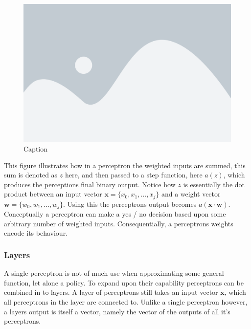 \begin{figure}[H]
    \centering
    \includegraphics[width=0.6\linewidth]{figures/placeholder.png}
    \caption{Caption}
    \label{fig:my_label}
\end{figure}
\noindent
This figure illustrates how in a perceptron the weighted inputs are summed, this sum is denoted as $z$ here, and then passed to a step function, here $a(z)$, which produces the perceptions final binary output. Notice how $z$ is essentially the dot product between an input vector $\mathbf{x} = \{x_0, x_1, \dots, x_j\}$ and a weight vector $\mathbf{w} = \{ w_0, w_1, \dots, w_j \}$. Using this the perceptrons output becomes $a(\mathbf{x} \cdot \mathbf{w})$. Conceptually a perceptron can make a yes / no decision based upon some arbitrary number of weighted inputs. Consequentially, a perceptrons weights encode its behaviour. 

\subsubsection{Layers}\label{subsubsec:nn:comp:layers}
A single perceptron is not of much use when approximating some general function, let alone a policy. To expand upon their capability perceptrons can be combined in to layers. A layer of perceptrons still takes an input vector $\mathbf{x}$, which all perceptrons in the layer are connected to. Unlike a single perceptron however, a layers output is itself a vector, namely the vector of the outputs of all it's perceptrons.

